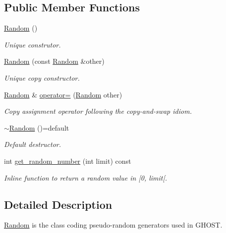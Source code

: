 \subsection*{Public Member Functions}
\begin{DoxyCompactItemize}
\item 
\hyperlink{classghost_1_1Random_a7c45efd1f7c522a68760104ba6084d89}{Random} ()
\begin{DoxyCompactList}\small\item\em Unique construtor. \end{DoxyCompactList}\item 
\hyperlink{classghost_1_1Random_aa57a39ee45a9ba30d7f7ea2c4c17b539}{Random} (const \hyperlink{classghost_1_1Random}{Random} \&other)
\begin{DoxyCompactList}\small\item\em Unique copy constructor. \end{DoxyCompactList}\item 
\hyperlink{classghost_1_1Random}{Random} \& \hyperlink{classghost_1_1Random_ab9257479f8e393fc8d205f6a05357ee6}{operator=} (\hyperlink{classghost_1_1Random}{Random} other)
\begin{DoxyCompactList}\small\item\em Copy assignment operator following the copy-\/and-\/swap idiom. \end{DoxyCompactList}\item 
\hyperlink{classghost_1_1Random_a5b2a324a97684d12174a6f97bdb43aaa}{$\sim$\+Random} ()=default
\begin{DoxyCompactList}\small\item\em Default destructor. \end{DoxyCompactList}\item 
int \hyperlink{classghost_1_1Random_acc4f1a79621ed8d77c303cecda571034}{get\+\_\+random\+\_\+number} (int limit) const 
\begin{DoxyCompactList}\small\item\em Inline function to return a random value in \mbox{[}0, limit\mbox{[}. \end{DoxyCompactList}\end{DoxyCompactItemize}


\subsection{Detailed Description}
\hyperlink{classghost_1_1Random}{Random} is the class coding pseudo-\/random generators used in G\+H\+O\+ST. 

